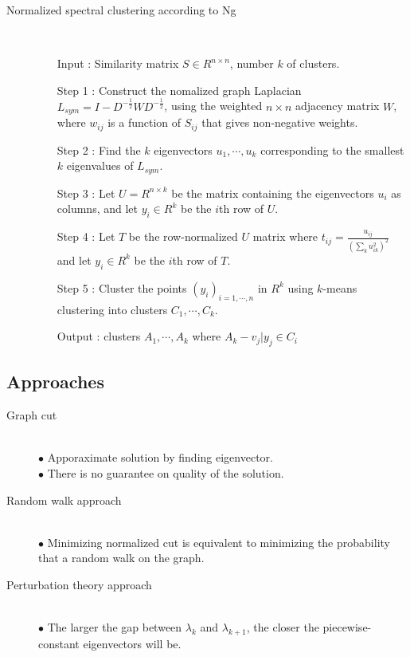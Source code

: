 \begin{description}
\item[Normalized spectral clustering according to Ng] \hfill \\

\begin{enumerate}
\item[Input] : Similarity matrix $S \in R^{n \times n}$, number $k$ of clusters. \\
\item[Step 1] : Construct the nomalized graph Laplacian $L_{sym} = I - D^{-\frac{1}{2}} W D^{-\frac{1}{2}}$, using the weighted $n \times n$ adjacency matrix $W$, where $w_{ij}$ is a function of $S_{ij}$ that gives non-negative weights. \\
\item[Step 2] : Find the $k$ eigenvectors $u_1, \cdots, u_k$ corresponding to the smallest $k$ eigenvalues of $L_{sym}$. \\
\item[Step 3] : Let $U = R^{n \times k}$ be the matrix containing the eigenvectors $u_i$ as columns, and let $y_i \in R^k$ be the $i$th row of $U$.\\
\item[Step 4] : Let $T$ be the row-normalized $U$ matrix where $t_{ij} = \frac{u_{ij}}{(\sum_k u_{ik}^2)^2}$ and let $y_i \in R^k$ be the $i$th row of $T$.\\
\item[Step 5] : Cluster the points $(y_i)_{i=1,\cdots,n}$ in $R^k$ using $k$-means clustering into clusters $C_1,\cdots,C_k$.\\
\item[Output] : clusters $A_1, \cdots, A_k$ where $A_k - {v_j|y_j \in C_i}$
\end{enumerate}

\end{description}

\subsection{Approaches}
\begin{description}
\item[Graph cut] \hfill \\
$\bullet$ Apporaximate solution by finding eigenvector. \\
$\bullet$ There is no guarantee on quality of the solution.
\item[Random walk approach] \hfill \\
$\bullet$ Minimizing normalized cut is equivalent to minimizing the probability that a random walk on the graph.
\item[Perturbation theory approach] \hfill \\
$\bullet$ The larger the gap between $\lambda_{k}$ and $\lambda_{k+1}$, the closer the piecewise-constant eigenvectors will be.
\end{description}

